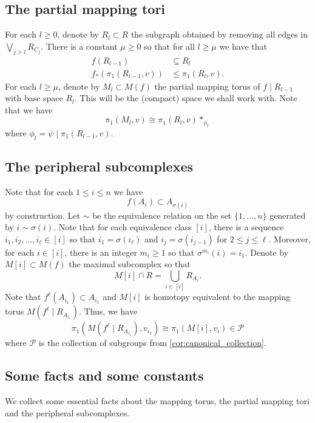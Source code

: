 \documentclass[11pt, a4paper]{amsart}
\theoremstyle{definition}
\begin{document}
\subsection*{The partial mapping tori}

For each $l\geqslant 0$, denote by $R_l\subset R$ the subgraph obtained by removing all edges in $\bigvee_{j>l}R_{C_j}$. There is a constant $\mu\geqslant 0$ so that for all $l\geqslant \mu$ we have that
\begin{align*}
f(R_{l-1}) &\subseteq R_{l}\\
f_*(\pi_1(R_{l-1}, v)) &\leqslant \pi_1(R_{l}, v).
\end{align*}
For each $l\geqslant \mu$, denote by $M_{l}\subset M(f)$ the partial mapping torus of $f\mid R_{l-1}$ with base space $R_{l}$. This will be the (compact) space we shall work with. Note that we have
\[
\pi_1(M_l, v) \cong \pi_1(R_{l}, v)*_{\phi_l}
\]
where $\phi_l = \psi\mid\pi_1(R_{l-1}, v)$.


\subsection*{The peripheral subcomplexes}

Note that for each $1\leqslant i\leqslant n$ we have
\[
f(A_i)\subset A_{\sigma(i)}
\]
by construction. Let $\sim$ be the equivalence relation on the set $\{1, \ldots, n\}$ generated by $i\sim \sigma(i)$. Note that for each equivalence class $[i]$, there is a sequence $i_1, i_2, \ldots, i_{\ell}\in [i]$ so that $i_1 = \sigma(i_{\ell})$ and $i_j = \sigma(i_{j-1})$ for $2\leqslant j\leqslant \ell$. Moreover, for each $i\in [i]$, there is an integer $m_i\geqslant 1$ so that $\sigma^{m_i}(i) = i_1$. Denote by $M[i]\subset M(f)$ the maximal subcomplex so that
\[
M[i] \cap R = \bigcup_{i\in [i]} R_{A_i}.
\]
Note that $f^{\ell}(A_{i_1})\subset A_{i_1}$ and $M[i]$ is homotopy equivalent to the mapping torus $M(f^{\ell}\mid R_{A_{i_1}})$. Thus, we have
\begin{equation}
\label{eq:submapping}
\pi_1(M(f^{\ell}\mid R_{A_{i_1}}), v_{i_1})\cong \pi_1(M[i], v_i)\in \mathcal{P}
\end{equation}
where $\mathcal{P}$ is the collection of subgroups from \cref{cor:canonical_collection}.


\subsection*{Some facts and some constants}

We collect some essential facts about the mapping torus, the partial mapping tori and the peripheral subcomplexes.
\end{document}

